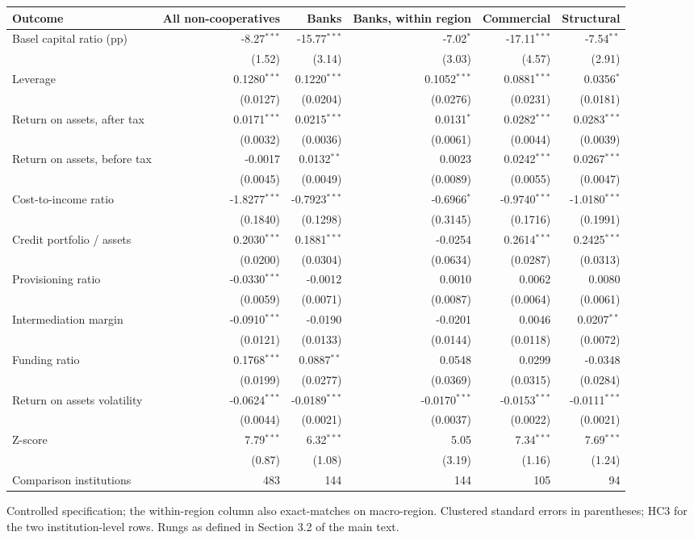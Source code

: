 \footnotesize
\setlength{\tabcolsep}{4pt}
\setlength{\tabcolsep}{3pt}
\begin{tabular}{lrrrrr}
\toprule
Outcome & All non-cooperatives & Banks & Banks, within region & Commercial & Structural \\
\midrule
Basel capital ratio (pp) & -8.27$^{***}$ & -15.77$^{***}$ & -7.02$^{*}$ & -17.11$^{***}$ & -7.54$^{**}$ \\
 & (1.52) & (3.14) & (3.03) & (4.57) & (2.91) \\
Leverage & 0.1280$^{***}$ & 0.1220$^{***}$ & 0.1052$^{***}$ & 0.0881$^{***}$ & 0.0356$^{*}$ \\
 & (0.0127) & (0.0204) & (0.0276) & (0.0231) & (0.0181) \\
Return on assets, after tax & 0.0171$^{***}$ & 0.0215$^{***}$ & 0.0131$^{*}$ & 0.0282$^{***}$ & 0.0283$^{***}$ \\
 & (0.0032) & (0.0036) & (0.0061) & (0.0044) & (0.0039) \\
Return on assets, before tax & -0.0017 & 0.0132$^{**}$ & 0.0023 & 0.0242$^{***}$ & 0.0267$^{***}$ \\
 & (0.0045) & (0.0049) & (0.0089) & (0.0055) & (0.0047) \\
Cost-to-income ratio & -1.8277$^{***}$ & -0.7923$^{***}$ & -0.6966$^{*}$ & -0.9740$^{***}$ & -1.0180$^{***}$ \\
 & (0.1840) & (0.1298) & (0.3145) & (0.1716) & (0.1991) \\
Credit portfolio / assets & 0.2030$^{***}$ & 0.1881$^{***}$ & -0.0254 & 0.2614$^{***}$ & 0.2425$^{***}$ \\
 & (0.0200) & (0.0304) & (0.0634) & (0.0287) & (0.0313) \\
Provisioning ratio & -0.0330$^{***}$ & -0.0012 & 0.0010 & 0.0062 & 0.0080 \\
 & (0.0059) & (0.0071) & (0.0087) & (0.0064) & (0.0061) \\
Intermediation margin & -0.0910$^{***}$ & -0.0190 & -0.0201 & 0.0046 & 0.0207$^{**}$ \\
 & (0.0121) & (0.0133) & (0.0144) & (0.0118) & (0.0072) \\
Funding ratio & 0.1768$^{***}$ & 0.0887$^{**}$ & 0.0548 & 0.0299 & -0.0348 \\
 & (0.0199) & (0.0277) & (0.0369) & (0.0315) & (0.0284) \\
\midrule
Return on assets volatility & -0.0624$^{***}$ & -0.0189$^{***}$ & -0.0170$^{***}$ & -0.0153$^{***}$ & -0.0111$^{***}$ \\
 & (0.0044) & (0.0021) & (0.0037) & (0.0022) & (0.0021) \\
Z-score & 7.79$^{***}$ & 6.32$^{***}$ & 5.05 & 7.34$^{***}$ & 7.69$^{***}$ \\
 & (0.87) & (1.08) & (3.19) & (1.16) & (1.24) \\
\midrule
Comparison institutions & 483 & 144 & 144 & 105 & 94 \\
\bottomrule
\end{tabular}
\begin{tablenotes}[flushleft]\footnotesize
\item Controlled specification; the within-region column also exact-matches on macro-region. Clustered standard errors in parentheses; HC3 for the two institution-level rows. Rungs as defined in Section 3.2 of the main text.
\end{tablenotes}

